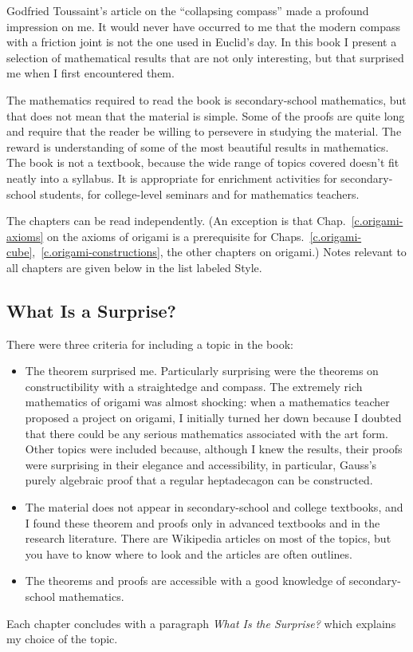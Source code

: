\preface

Godfried Toussaint's article on the ``collapsing compass''  \cite{toussaint} made a profound impression on me. It would never have occurred to me that the modern compass with a friction joint is not the one used in Euclid's day. In this book I present a selection of mathematical results that are not only interesting, but that surprised me when I first encountered them.

The mathematics required to read the book is secondary-school mathematics, but that does not mean that the material is simple. Some of the proofs are quite long and require that the reader be willing to persevere in studying the material. The reward is understanding of some of the most beautiful results in mathematics. The book is not a textbook, because the wide range of topics covered doesn't fit neatly into a syllabus. It is appropriate for enrichment activities for secondary-school students, for college-level seminars and for mathematics teachers.

 The chapters can be read independently. (An exception is that Chap.~\ref{c.origami-axioms} on the axioms of origami is a prerequisite for Chaps.~\ref{c.origami-cube},~\ref{c.origami-constructions}, the other chapters on origami.) Notes relevant to all chapters are given below in the list labeled Style.

\subsection*{What Is a Surprise?}

There were three criteria for including a topic in the book:
\begin{itemize}
\item The theorem surprised me. Particularly surprising were the theorems on constructibility with a straightedge and compass. The extremely rich mathematics of origami was almost shocking: when a mathematics teacher proposed a project on origami, I initially turned her down because I doubted that there could be any serious mathematics associated with the art form.
Other topics were included because, although I knew the results, their proofs were surprising in their elegance and accessibility, in particular, Gauss's purely algebraic proof that a regular heptadecagon can be constructed.

\item The material does not appear in secondary-school and college textbooks, and I found these theorem and proofs only in advanced textbooks and in the research literature. There are Wikipedia articles on most of the topics, but you have to know where to look and the articles are often outlines.

\item The theorems and proofs are accessible with a good knowledge of secondary-school mathematics.
\end{itemize}
Each chapter concludes with a paragraph \textit{What Is the Surprise?} which explains my choice of the topic.

